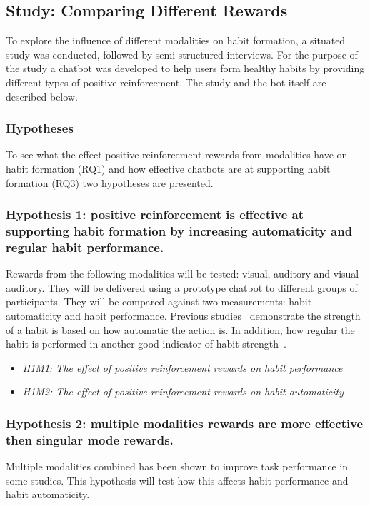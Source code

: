 \subsection{Study: Comparing Different Rewards} \label{study_comparing_rewards}
To explore the influence of different modalities on habit formation, a situated study was conducted, followed by semi-structured interviews. For the purpose of the study a chatbot was developed to help users form healthy habits by providing different types of positive reinforcement. The study and the bot itself are described below.


\subsubsection{Hypotheses} \label{hypothese}
To see what the effect positive reinforcement rewards from modalities have on habit formation (RQ1) and how effective chatbots are at supporting habit formation (RQ3) two hypotheses are presented.

\subsubsection*{Hypothesis 1: positive reinforcement is effective at supporting habit formation by increasing automaticity and regular habit performance.}
Rewards from the following modalities will be tested: visual, auditory and visual-auditory. They will be delivered using a prototype chatbot to different groups of participants. They will be compared against two measurements: habit automaticity and habit performance. Previous studies~\cite{article_habit_strength, article_4q_SRBAI} demonstrate the strength of a habit is based on how automatic the action is. In addition, how regular the habit is performed in another good indicator of habit strength~\cite{article_promoting_habit_formation, article_experiences_of_habit_formation}.

\begin{itemize}
  \item \textit{H1M1: The effect of positive reinforcement rewards on habit performance}
  \item \textit{H1M2: The effect of positive reinforcement rewards on habit automaticity}
\end{itemize}

\subsubsection*{Hypothesis 2: multiple modalities rewards are more effective then singular mode rewards.}
Multiple modalities combined has been shown to improve task performance in some studies. This hypothesis will test how this affects habit performance and habit automaticity.

